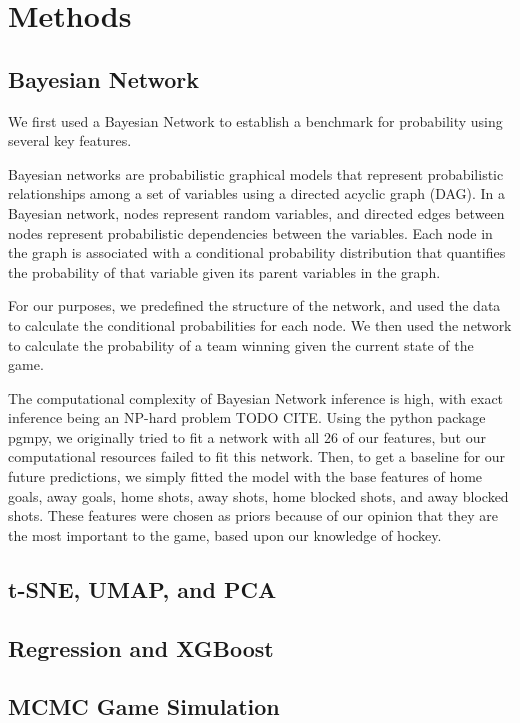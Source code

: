 \documentclass[11pt]{article}
\begin{document}
\section{Methods}

\subsection{Bayesian Network}
We first used a Bayesian Network to establish a benchmark for probability using several key features.

Bayesian networks are probabilistic graphical models that represent probabilistic relationships among a set of variables using a directed acyclic graph (DAG). 
In a Bayesian network, nodes represent random variables, and directed edges between nodes represent probabilistic dependencies between the variables. Each node in the graph is associated with a conditional probability distribution that quantifies the probability of that variable given its parent variables in the graph.

For our purposes, we predefined the structure of the network, and used the data to calculate the conditional probabilities for each node. We then used the network to calculate the probability of a team winning given the current state of the game.

The computational complexity of Bayesian Network inference is high, with exact inference being an NP-hard problem TODO CITE. 
Using the python package pgmpy, we originally tried to fit a network with all 26 of our features, but our computational resources failed to fit this network.
Then, to get a baseline for our future predictions, we simply fitted the model with the base features of home goals, away goals, home shots, away shots, home blocked shots, and away blocked shots. 
These features were chosen as priors because of our opinion that they are the most important to the game, based upon our knowledge of hockey.


\subsection{t-SNE, UMAP, and PCA}

\subsection{Regression and XGBoost}

\subsection{MCMC Game Simulation}
\end{document}
